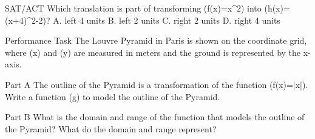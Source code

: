 \documentclass{article}
\newenvironment{practice}[2]{}{}        %
\newcommand{\answer}[1]{}               %
\newcommand{\placeholder}[2]{}          %
\begin{document}
\begin{practice}{37}{3}
SAT/ACT Which translation is part of transforming (f(x)=x^2) into (h(x)=(x+4)^2-2)?
A. left 4 units
B. left 2 units
C. right 2 units
D. right 4 units
\answer{A}
\end{practice}
\begin{practice}{38}{3}
Performance Task The Louvre Pyramid in Paris is shown on the coordinate grid, where (x) and (y) are measured in meters and the ground is represented by the x-axis.
\placeholder{graph}{Illustration of Louvre Pyramid, black outline joins (0,0), filled apex (17.7,21.6), filled right endpoint (35.4,0), with callouts (17.7,21.6) and (35.4,0). x/y axes arrowed, x labels 0,20,40 and y label 20, square-looking grid spacing 5 meters. Visible window approximately x=0 to 40,y=0 to 25. No arrows on pyramid outline.}
Part A The outline of the Pyramid is a transformation of the function (f(x)=|x|). Write a function (g) to model the outline of the Pyramid.
\answer{Part A (g(x)=-1.22|x-17.7|+21.6)}
Part B What is the domain and range of the function that models the outline of the Pyramid? What do the domain and range represent?
\answer{Part B domain: (0\leq x\leq35.4); range: (0\leq y\leq21.6); The domain represents the width of the pyramid, which is 35.4 m wide. The range represents the height of the pyramid, which is 21.6 m high.}
\end{practice}
\end{document}

